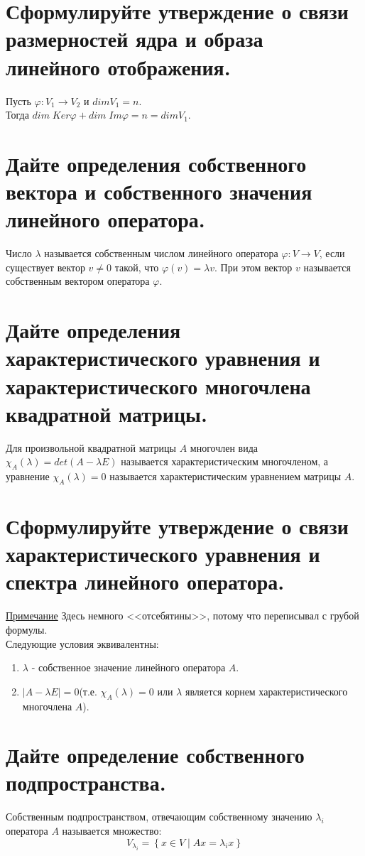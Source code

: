 \documentclass{article}
\begin{document}
\section{Сформулируйте утверждение о связи размерностей ядра и образа линейного отображения.}
Пусть $\varphi : V_1 \longrightarrow V_2$ и $dim V_1 = n$.\\
Тогда $dim \; Ker \varphi + dim \; Im \varphi = n = dim V_1$.

\section{Дайте определения собственного вектора и собственного значения линейного оператора.}
Число $\lambda$ называется собственным числом линейного оператора $\varphi: V \longrightarrow V$,
если существует вектор $v \neq 0$ такой, что $\varphi(v) = \lambda v$.
При этом вектор $v$ называется собственным вектором оператора $\varphi$.

\section{Дайте определения характеристического уравнения и характеристического многочлена квадратной матрицы.}
Для произвольной квадратной матрицы $A$ многочлен вида $\chi_A(\lambda) = det(A - \lambda E)$ называется 
характеристическим многочленом, а уравнение $\chi_A(\lambda) = 0$ называется характеристическим
уравнением матрицы $A$.

\section{Сформулируйте утверждение о связи характеристического уравнения и спектра линейного оператора.}
\underline{Примечание} Здесь немного <<отсебятины>>, потому что переписывал с грубой формулы.
\\
Следующие условия эквивалентны:
\begin{enumerate}
    \item $\lambda$ - собственное значение линейного оператора $A$.
    \item $|A - \lambda E| = 0$(т.е. $\chi_A(\lambda) = 0$ или $\lambda$ является корнем характеристического многочлена $A$).
\end{enumerate}

\section{Дайте определение собственного подпространства.}
Собственным подпространством, отвечающим собственному значению $\lambda_i$ оператора $A$
называется множество:
$$ V_{\lambda_i} = \left\{x \in V \mid Ax = \lambda_i x \right\}$$
\end{document}
